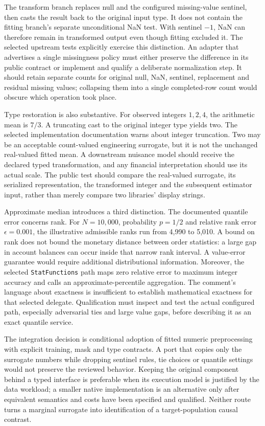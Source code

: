The transform branch replaces null and the configured missing-value sentinel, then casts the result back to the original input type. It does not contain the fitting branch's separate unconditional NaN test. With sentinel $-1$, NaN can therefore remain in transformed output even though fitting excluded it. The selected upstream tests explicitly exercise this distinction. An adapter that advertises a single missingness policy must either preserve the difference in its public contract or implement and qualify a deliberate normalization step. It should retain separate counts for original null, NaN, sentinel, replacement and residual missing values; collapsing them into a single completed-row count would obscure which operation took place.~\citep{exec25_otm_spark,exec25_otm_choice}

Type restoration is also substantive. For observed integers $1,2,4$, the arithmetic mean is $7/3$. A truncating cast to the original integer type yields two. The selected implementation documentation warns about integer truncation. Two may be an acceptable count-valued engineering surrogate, but it is not the unchanged real-valued fitted mean. A downstream nuisance model should receive the declared typed transformation, and any financial interpretation should use its actual scale. The public test should compare the real-valued surrogate, its serialized representation, the transformed integer and the subsequent estimator input, rather than merely compare two libraries' display strings.~\citep{exec25_otm_spark,exec25_otm_choice}

Approximate median introduces a third distinction. The documented quantile error concerns rank. For $N=10{,}000$, probability $p=1/2$ and relative rank error $\epsilon=0.001$, the illustrative admissible ranks run from 4,990 to 5,010. A bound on rank does not bound the monetary distance between order statistics: a large gap in account balances can occur inside that narrow rank interval. A value-error guarantee would require additional distributional information. Moreover, the selected \texttt{StatFunctions} path maps zero relative error to maximum integer accuracy and calls an approximate-percentile aggregation. The comment's language about exactness is insufficient to establish mathematical exactness for that selected delegate. Qualification must inspect and test the actual configured path, especially adversarial ties and large value gaps, before describing it as an exact quantile service.~\citep{exec25_otm_spark,exec25_otm_choice}

The integration decision is conditional adoption of fitted numeric preprocessing with explicit training, mask and type contracts. A port that copies only the surrogate numbers while dropping sentinel rules, tie choices or quantile settings would not preserve the reviewed behavior. Keeping the original component behind a typed interface is preferable when its execution model is justified by the data workload; a smaller native implementation is an alternative only after equivalent semantics and costs have been specified and qualified. Neither route turns a marginal surrogate into identification of a target-population causal contrast.~\citep{exec25_otm_spark,exec25_otm_choice}

